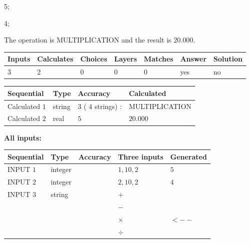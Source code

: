 \documentclass[12pt]{article}
\begin{document}
 

5;
 
4;
 
The operation is  %
MULTIPLICATION and the result is
$ %
20.000$.
 
 
 
\noindent{}
 
 

 
\vspace{0.3in}
   
   
   
   
\noindent\begin{tabular}{|l|l|l|l|l|l|l|}
 \hline
Inputs & Calculates & Choices & Layers & Matches & Answer & Solution \\ \hline
           3 & 
           2 & 
           0
  & 
           0 & 
           0 & 
  yes & 
  no 
  \\ \hline
 \end{tabular}
   
   
   
   
\noindent{}
   
   
  
  
\noindent\begin{tabular}{|l|l|l|l|}
\hline
 Sequential & Type & Accuracy & Calculated \\ 
\hline
 
 
  Calculated $           1$ & string & $           3 $ ( $          4 $ strings)
 : 
 & MULTIPLICATION
 \\  \hline  
 
 
  Calculated $           2$ & real & $           5 $ & 
 $ 20.000 $ 
 \\  \hline  
 \end{tabular}
   
   
   
   
\noindent\vspace{0.1in}\hspace{-0.08in} {\textbf{\Large{All inputs: }}}
   
   
  
  
\noindent\begin{tabular}{|l|l|l|l|l|}
\hline
 Sequential & Type & Accuracy & Three inputs & Generated \\ 
\hline
 
 
  INPUT $           1$ & integer &  & $
 1
 , 
 10
 , 
 2
 $ & $ 5 $ 
 \\  \hline  
 
 
  INPUT $           2$ & integer &  & $
 2
 , 
 10
 , 
 2
 $ & $ 4 $ 
 \\  \hline  
 
 
  INPUT $           3$ & string & & 
 $+$ & 
  \\
  & & & 
 $-$ & 
  \\
  & & & 
 $\times$ & 
  $ <-- $ 
  \\
  & & & 
 $\div$ & 
 \\  \hline  
 \end{tabular}
   
\end{document}
